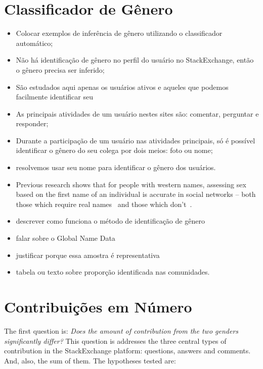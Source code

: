 \section{Classificador de Gênero} %
\label{sub:classificador_de_g_nero}
\begin{itemize}
	\item Colocar exemplos de inferência de gênero utilizando o classificador automático;
	\item Não há identificação de gênero no perfil do usuário no StackExchange, então o gênero precisa ser inferido;
	\item São estudados aqui apenas os usuários ativos e aqueles que podemos facilmente identificar seu 
	\item As principais atividades de um usuário nestes sites são: comentar, perguntar e responder;
	\item Durante a participação de um usuário nas atividades principais, só é possível identificar o gênero do seu colega por dois meios: foto ou nome;
	\item resolvemos usar seu nome para identificar o gênero dos usuários.
	\item Previous research shows that for people with western names, assessing sex based on the first name of an individual is accurate in social networks -- both those which require real names~\cite{tang2011s} and those which don't~\cite{burger2011discriminating}\cite{liu2013s}. 
	\item descrever como funciona o método de identificação de gênero
	\item falar sobre o Global Name Data
	\item justificar porque essa amostra é representativa
	\item tabela ou texto sobre proporção identificada nas comunidades.
\end{itemize}


\section{Contribuições em Número} %
\label{sub:contribui_es_em_numero}

The first question is: \textit{Does the amount of contribution from the two genders significantly differ?}
This question is addresses the three central types of contribution in the StackExchange platform: questions, answers and comments. And, also, the sum of them. The hypotheses tested are:
    
